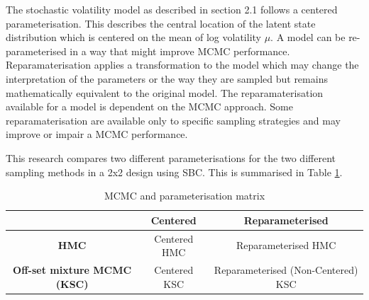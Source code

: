 \documentclass[12pt, a4paper]{article}
\begin{document}
        The stochastic volatility model as described in section 2.1 follows a centered parameterisation. This describes the central location of the latent state distribution which is centered on the mean of log volatility $\mu$. A model can be re-parameterised in a way that might improve MCMC performance. Reparamaterisation applies a transformation to the model which may change the interpretation of the parameters or the way they are sampled but remains mathematically equivalent to the original model. The reparamaterisation available for a model is dependent on the MCMC approach. Some reparamaterisation are available only to specific sampling strategies and may improve or impair a MCMC performance. 

        This research compares two different parameterisations for the two different sampling methods in a 2x2 design using SBC. This is summarised in Table \ref{tab:params}.
        \begin{table}
            \centering
            \begin{tabular}{|c|c|c|} \hline 
                 &  \textbf{Centered}& \textbf{Reparameterised}\\ \hline 
                 \textbf{HMC}&  Centered HMC& Reparameterised HMC\\ \hline 
                 \textbf{Off-set mixture MCMC (KSC)}&  Centered KSC& Reparameterised (Non-Centered) KSC\\ \hline
            \end{tabular}
            \caption{MCMC and parameterisation matrix}
            \label{tab:params}
        \end{table}
\end{document}
